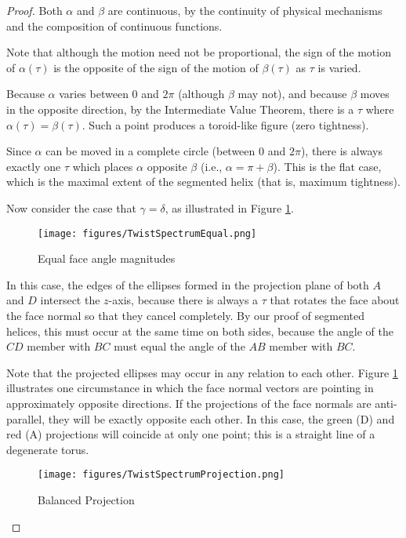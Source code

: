 \documentclass[11pt]{article}
\begin{document}
{\begin{proof}
    Both $\alpha$ and $\beta$ are continuous, by the continuity of
    physical mechanisms and the composition of continuous functions.

    Note that although the motion need not be proportional, the sign
    of the motion of $\alpha(\tau)$ is the opposite of the sign of the
    motion of $\beta(\tau)$ as $\tau$ is varied.

    Because $\alpha$ varies between $0$ and $2\pi$ (although
    $\beta$ may not), and because $\beta$ moves in the opposite direction,
    by the Intermediate Value Theorem, there is a $\tau$ where
    $\alpha(\tau) = \beta(\tau)$. Such a point produces a toroid-like
    figure (zero tightness).

    Since $\alpha$ can be moved in a complete circle (between 0 and
    $2\pi$), there is always
    exactly one
    $\tau$ which places $\alpha$ opposite $\beta$
    (i.e., $\alpha = \pi + \beta$). This is the flat case, which
    is the maximal extent of the segmented helix (that is, maximum tightness).

    Now consider the case that $\gamma = \delta$, as illustrated
    in Figure \ref{fig:twistspectrumequal}.

    \begin{figure}
     \centering
     \texttt{[image: figures/TwistSpectrumEqual.png]}
     \caption{Equal face angle magnitudes}
  \label{fig:twistspectrumequal}
    \end{figure}

    In this case, the edges of the ellipses formed in the projection plane of both $A$ and $D$
    intersect
    the $z$-axis, because there is always a $\tau$ that rotates
    the face about the face normal so that they cancel completely. By our
    proof of segmented helices, this must occur at the same time on both sides,
    because the angle of the $CD$ member with $BC$ must equal the angle of the $AB$ member
    with $BC$.

    Note that the projected ellipses may occur in any relation to each other.
    Figure \ref{fig:twistspectrumequal} illustrates one circumstance in which the face normal
    vectors are pointing in approximately opposite directions.
    If the
    projections of the
    face normals are anti-parallel, they will be exactly opposite each other. In this
    case, the green (D) and red (A) projections will coincide at only one point; this
    is a straight line of a degenerate torus.
        \begin{figure}
     \centering
     \texttt{[image: figures/TwistSpectrumProjection.png]}
     \caption{Balanced Projection}
  \label{fig:twistspectrumprojection}
    \end{figure}


\end{proof}}
\end{document}
